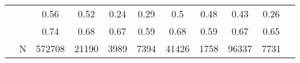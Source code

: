 \begin{table}[ht]
\begin{tabular}{l>{\raggedright\arraybackslash}p{3.2cm}|ccccccccc}
   & \multicolumn{1}{>{\raggedleft\arraybackslash}p{2.9cm}|}{\makebox[2.9cm][r]{Lives with Child }} & 0.56 & 0.52 & 0.24 & 0.29 & 0.5 & 0.48 & 0.43 & 0.26 \\ 
   & \multicolumn{1}{>{\raggedleft\arraybackslash}p{3.4cm}|}{\makebox[3.4cm][r]{Married/Cohabiting }} & 0.74 & 0.68 & 0.67 & 0.59 & 0.68 & 0.59 & 0.67 & 0.65 \\ 
   & N & 572708 & 21190 & 3989 & 7394 & 41426 & 1758 & 96337 & 7731 \\ 
   \hline
\end{tabular}
\endgroup
\end{table}
